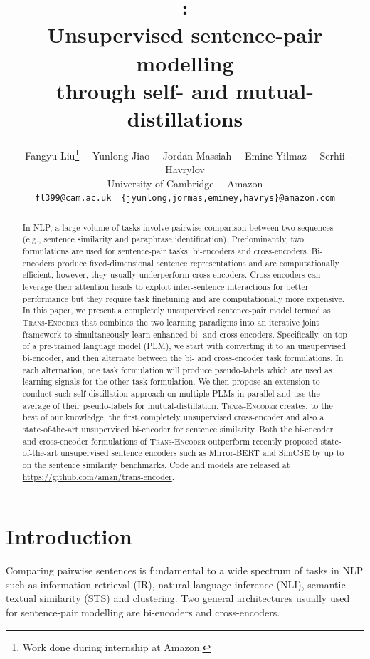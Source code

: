 \documentclass{article} \usepackage{iclr2021_conference,times}
\title{\modelname: \\
Unsupervised sentence-pair modelling\\ through self- and mutual-distillations}
\author{Fangyu Liu\thanks{Work done during internship at Amazon.} \ \ Yunlong Jiao \ \  Jordan Massiah \ \ Emine Yilmaz \ \ Serhii Havrylov \\ 
University of Cambridge \ \
Amazon \\
\texttt{fl399@cam.ac.uk}\ \ \texttt{\{jyunlong,jormas,eminey,havrys\}@amazon.com} \\
}
\newcommand{\modelname}{\textsc{Trans-Encoder}\xspace}
\begin{document}
\maketitle

\begin{abstract}
In NLP, a large volume of tasks involve pairwise comparison between two sequences (e.g., sentence similarity and paraphrase identification). 
Predominantly, two formulations are used for sentence-pair tasks: bi-encoders and cross-encoders. 
Bi-encoders produce fixed-dimensional sentence representations and are computationally efficient, however, they usually underperform cross-encoders. 
Cross-encoders can leverage their attention heads to exploit inter-sentence interactions for better performance but they require task finetuning and are computationally more expensive. 
In this paper, we present a completely unsupervised sentence-pair model termed as \modelname that combines the two learning paradigms into an iterative joint framework to simultaneously learn enhanced bi- and cross-encoders. 
Specifically, on top of a pre-trained language model (PLM), we start with converting it to an unsupervised bi-encoder, and then alternate between the bi- and cross-encoder task formulations. 
In each alternation, one task formulation will produce pseudo-labels which are used as learning signals for the other task formulation. We then propose an extension to conduct such self-distillation approach on multiple PLMs in parallel and use the average of their pseudo-labels for mutual-distillation. 
\modelname creates, to the best of our knowledge, the first completely unsupervised cross-encoder and also a state-of-the-art unsupervised bi-encoder for sentence similarity. 
Both the bi-encoder and cross-encoder formulations of \modelname outperform recently proposed state-of-the-art unsupervised sentence encoders such as Mirror-BERT \citep{liu2021fast} and SimCSE \citep{gao2021simcse} by up to  on the sentence similarity benchmarks. Code and models are released at \url{https://github.com/amzn/trans-encoder}.

\end{abstract}

\section{Introduction}
Comparing pairwise sentences is fundamental to a wide spectrum of tasks in NLP such as information retrieval (IR), natural language inference (NLI), semantic textual similarity (STS) and clustering. 
Two general architectures usually used for sentence-pair modelling are bi-encoders and cross-encoders. 
\end{document}
